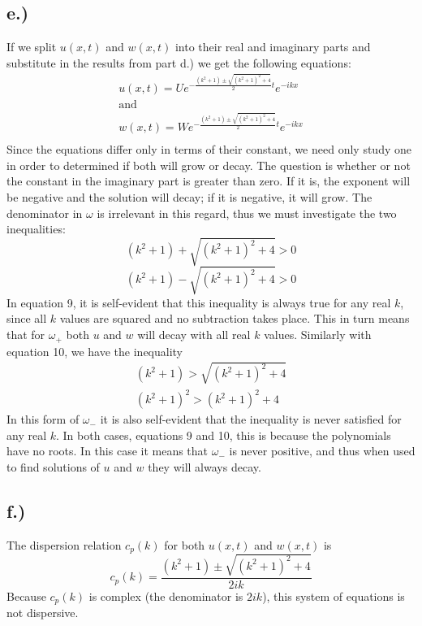 \documentclass{article}
\begin{document}
\subsection*{e.)}
If we split $u(x, t)$ and $w(x,t)$ into their real and imaginary parts and substitute in the results from part d.) we get the following equations:
\begin{equation}
\begin{aligned}
u(x, t) = Ue^{-\frac{(k^2 + 1) \pm \sqrt{(k^2 + 1)^2 +4}}{2}t}e^{-ikx}\\
\text{and}\\
w(x, t) = We^{-\frac{(k^2 + 1) \pm \sqrt{(k^2 + 1)^2 +4}}{2}t}e^{-ikx}\\
\end{aligned}
\end{equation}
Since the equations differ only in terms of their constant, we need only study one in order to determined if both will grow or decay. The question is whether or not the constant in the imaginary part is greater than zero. If it is, the exponent will be negative and the solution will decay; if it is negative, it will grow. The denominator in $\omega$ is irrelevant in this regard, thus we must investigate the two inequalities:
\begin{equation}
(k^2 + 1) + \sqrt{(k^2 + 1)^2 +4} > 0
\end{equation}
\begin{equation}
(k^2 + 1) - \sqrt{(k^2 + 1)^2 +4} > 0
\end{equation}
In equation 9, it is self-evident that this inequality is always true for any real $k$, since all $k$ values are squared and no subtraction takes place. This in turn means that for $\omega_+$ both $u$ and $w$ will decay with all real $k$ values.
Similarly with equation 10, we have the inequality
\begin{equation}
\begin{aligned}
(k^2 + 1) > \sqrt{(k^2 + 1)^2 +4}\\
(k^2 + 1)^2 > (k^2 +1)^2 + 4
\end{aligned}
\end{equation}
In this form of $\omega_-$ it is also self-evident that the inequality is never satisfied for any real $k$. In both cases, equations 9 and 10, this is because the polynomials have no roots. In this case it means that $\omega_-$ is never positive, and thus when used to find solutions of $u$ and $w$ they will always decay.
\subsection*{f.)}
The dispersion relation $c_p(k)$ for both $u(x,t)$ and $w(x, t)$ is 
\begin{equation}
c_p(k) = \frac{(k^2 + 1) \pm \sqrt{(k^2 + 1)^2 +4}}{2ik}
\end{equation}
Because $c_p(k)$ is complex (the denominator is $2ik$), this system of equations is not dispersive. 
\end{document}
